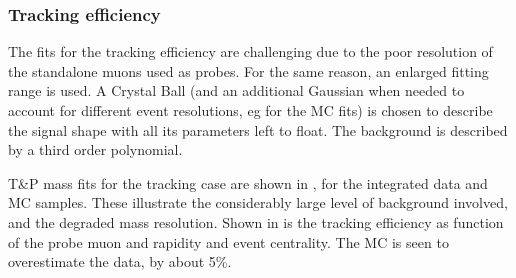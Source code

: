 \subsubsection{Tracking efficiency}


The fits for the tracking efficiency are challenging due to the poor resolution of the standalone muons used as probes. For the same reason, an enlarged fitting range is used. 
A Crystal Ball (and an additional Gaussian when needed to account for different event resolutions, eg for the MC fits) is chosen to describe the signal shape with all its parameters left to float. The background is described by a third order polynomial. 

T\&P mass fits for the tracking case are shown in , for the integrated data and MC samples.
These illustrate the considerably large level of background involved, and the degraded mass resolution. 
%
Shown in  is the tracking efficiency as function of the probe muon \pt and rapidity and event centrality. %
The MC is seen to overestimate the data, by about 5\%.
%


